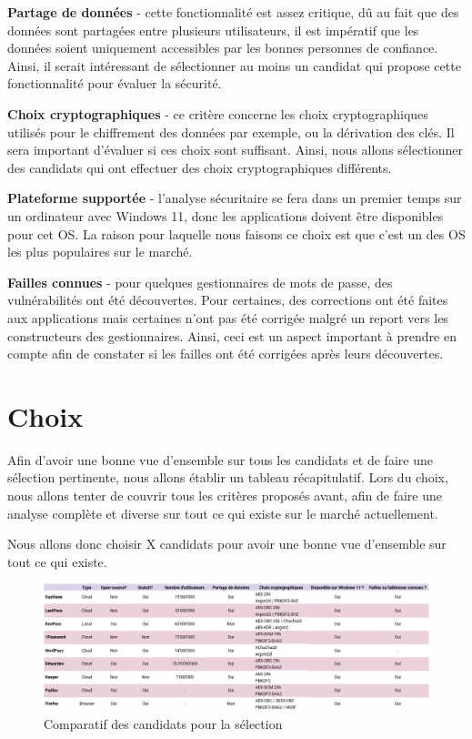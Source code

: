 \textbf{Partage de données} - cette fonctionnalité est assez critique, dû au fait que des données sont partagées
entre plusieurs utilisateurs, il est impératif que les données soient uniquement accessibles par les bonnes personnes
de confiance. Ainsi, il serait intéressant de sélectionner au moins un candidat qui propose cette fonctionnalité pour
évaluer la sécurité.

\textbf{Choix cryptographiques} - ce critère concerne les choix cryptographiques utilisés pour le chiffrement des
données par exemple, ou la dérivation des clés. Il sera important d'évaluer si ces choix sont suffisant. Ainsi, nous
allons sélectionner des candidats qui ont effectuer des choix cryptographiques différents.

\textbf{Plateforme supportée} - l'analyse sécuritaire se fera dans un premier temps sur un ordinateur avec Windows
11, donc les applications doivent être disponibles pour cet OS. La raison pour laquelle nous faisons ce choix est que c'est un des OS les plus populaires sur le marché.

\textbf{Failles connues} - pour quelques gestionnaires de mots de passe, des vulnérabilités ont été découvertes. Pour
certaines, des corrections ont été faites aux applications mais certaines n'ont pas été corrigée malgré un report
vers les constructeurs des gestionnaires. Ainsi, ceci est un aspect important à prendre en compte afin de constater
si les failles ont été corrigées après leurs découvertes.

\section{Choix}
Afin d'avoir une bonne vue d'ensemble sur tous les candidats et de faire une sélection pertinente, nous allons
établir un tableau récapitulatif. Lors du choix, nous allons tenter de couvrir tous les critères proposés avant, afin
de faire une analyse complète et diverse sur tout ce qui existe sur le marché actuellement.

Nous allons donc choisir X candidats pour avoir une bonne vue d'ensemble sur tout ce qui existe.

\begin{figure}[H]
	\centering
	\includegraphics[scale=0.5, angle=90]{images/selection_choix.png}
	\caption{Comparatif des candidats pour la sélection}
\end{figure}

